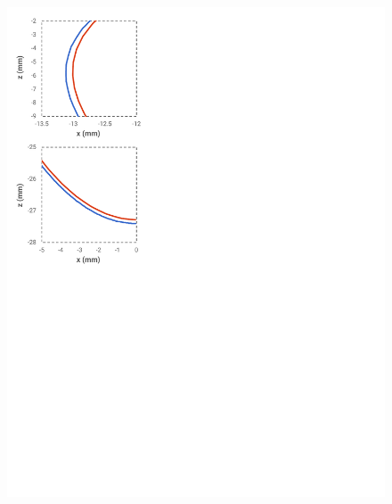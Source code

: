 \begin{figure}[ht!]
{		\includegraphics[scale=0.45]{media/5-verif/5-land2/land2-2.pdf}
\label{fig:land2-2}}	
\end{figure}
